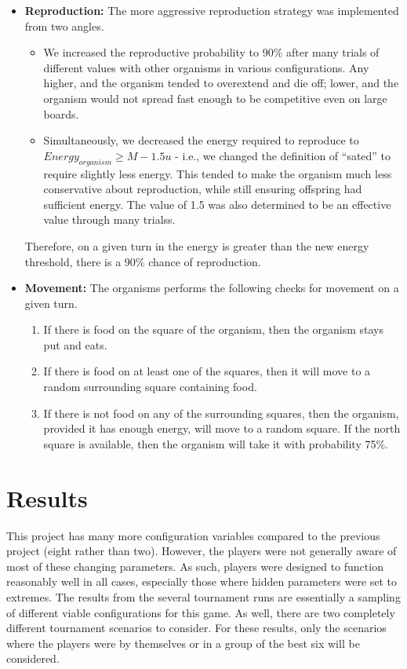 \documentclass[
10pt, %
letterpaper, %
oneside, %
headinclude,footinclude, %
english
]{article}
\begin{document}
\begin{itemize}
  \item \textbf{Reproduction:} The more aggressive reproduction strategy was implemented from two angles.
    \begin{itemize}
      \item We increased the reproductive probability to 90\% after many trials of different values with other organisms in various configurations. Any higher, and the organism tended to overextend and die off; lower, and the organism would not spread fast enough to be competitive even on large boards.
      \item Simultaneously, we decreased the energy required to reproduce to $Energy_{organism} \geq M - 1.5 u$ - i.e., we changed the definition of ``sated'' to require slightly less energy. This tended to make  the organism much less conservative about reproduction, while still ensuring offspring had sufficient energy. The value of 1.5 was also determined to be an effective value through many trialss.
    \end{itemize}
    Therefore, on a given turn in the energy is greater than the new energy threshold, there is a 90\% chance of reproduction.
  \item \textbf{Movement:} The organisms performs the following checks for movement on a given turn.
  \begin{enumerate}
    \item If there is food on the square of the organism, then the organism stays put and eats.
    \item   If there is food on at least one of the squares, then it will move to a random surrounding square containing food.
    \item  If there is not food on any of the surrounding squares, then the organism, provided it has enough energy, will move to a random square. If the north square is available, then the organism will take it with probability 75\%.
  \end{enumerate}
\end{itemize}

\section{Results}
This project has many more configuration variables compared to the previous project (eight rather than two). However, the players were not generally aware of most of these changing parameters. As such, players were designed to function reasonably well in all cases, especially those where hidden parameters were set to extremes. The results from the several tournament runs are essentially a sampling of different viable configurations for this game. As well, there are two completely different tournament scenarios to consider. For these results, only the scenarios where the players were by themselves or in a group of the best six will be considered.
\end{document}

